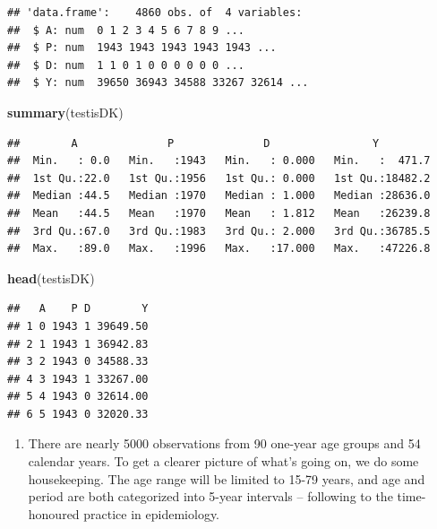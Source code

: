 \documentclass[
]{book}
\newenvironment{Shaded}{\begin{snugshade}}{\end{snugshade}}
\newcommand{\FunctionTok}[1]{\textcolor[rgb]{0.13,0.29,0.53}{\textbf{#1}}}
\newcommand{\NormalTok}[1]{#1}
\providecommand{\tightlist}{%
  \setlength{\itemsep}{0pt}\setlength{\parskip}{0pt}}
\begin{document}
\begin{verbatim}
## 'data.frame':    4860 obs. of  4 variables:
##  $ A: num  0 1 2 3 4 5 6 7 8 9 ...
##  $ P: num  1943 1943 1943 1943 1943 ...
##  $ D: num  1 1 0 1 0 0 0 0 0 0 ...
##  $ Y: num  39650 36943 34588 33267 32614 ...
\end{verbatim}

\begin{Shaded}
\begin{Highlighting}[]
\FunctionTok{summary}\NormalTok{(testisDK)}
\end{Highlighting}
\end{Shaded}

\begin{verbatim}
##        A              P              D                Y          
##  Min.   : 0.0   Min.   :1943   Min.   : 0.000   Min.   :  471.7  
##  1st Qu.:22.0   1st Qu.:1956   1st Qu.: 0.000   1st Qu.:18482.2  
##  Median :44.5   Median :1970   Median : 1.000   Median :28636.0  
##  Mean   :44.5   Mean   :1970   Mean   : 1.812   Mean   :26239.8  
##  3rd Qu.:67.0   3rd Qu.:1983   3rd Qu.: 2.000   3rd Qu.:36785.5  
##  Max.   :89.0   Max.   :1996   Max.   :17.000   Max.   :47226.8
\end{verbatim}

\begin{Shaded}
\begin{Highlighting}[]
\FunctionTok{head}\NormalTok{(testisDK)}
\end{Highlighting}
\end{Shaded}

\begin{verbatim}
##   A    P D        Y
## 1 0 1943 1 39649.50
## 2 1 1943 1 36942.83
## 3 2 1943 0 34588.33
## 4 3 1943 1 33267.00
## 5 4 1943 0 32614.00
## 6 5 1943 0 32020.33
\end{verbatim}

\begin{enumerate}
\def\labelenumi{\arabic{enumi}.}
\setcounter{enumi}{1}
\tightlist
\item
  There are nearly 5000 observations from 90 one-year age groups
  and 54 calendar years. To get a clearer picture of what's going on,
  we do some housekeeping. The age range will be limited to 15-79
  years, and age and period are both categorized into 5-year intervals -- following to the time-honoured practice in epidemiology.
\end{enumerate}
\end{document}
